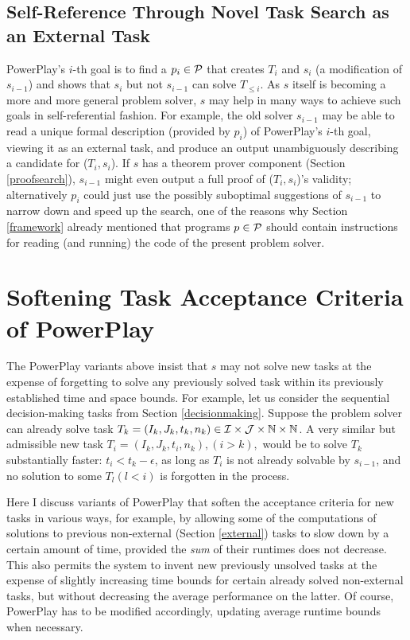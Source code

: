 \documentclass{article}
\begin{document}
\subsection{Self-Reference Through Novel Task Search as an External Task}
\label{self}

 {\sc PowerPlay}'s $i$-th goal is to find a $p_i \in \cal P$ that creates $T_i$ and $s_i$ 
(a modification of $s_{i-1}$)    
and shows that  $s_i$ but not $s_{i-1}$ can solve $T_{\leq i}$. 
As $s$ itself is becoming a more and more general problem solver,  
$s$ may help in many ways to achieve such goals in self-referential fashion.
For example, the old solver $s_{i-1}$ may be able to
read a unique formal description (provided by $p_i$) of {\sc PowerPlay}'s $i$-th goal, viewing it as an external task,
and produce an output unambiguously describing
a candidate for ($T_i,s_i$). 
If $s$ has a theorem prover component (Section \ref{proofsearch}),
$s_{i-1}$ might even output a full proof of ($T_i,s_i$)'s validity; alternatively $p_i$ 
could just use the possibly suboptimal
suggestions of $s_{i-1}$ to  narrow down and speed up the search,
one of the reasons why Section \ref{framework} already mentioned that
programs $p \in \cal P$
should contain instructions for reading  (and running) the code of the present problem solver. 



\section{Softening Task Acceptance Criteria of {\sc PowerPlay}}
\label{softening}

The {\sc PowerPlay} variants above insist that $s$ may not solve new tasks at the expense of forgetting to solve any previously solved task
within its previously established time and space bounds. 
For example, let us consider the sequential decision-making tasks from Section \ref{decisionmaking}.
Suppose the problem solver can already solve task $T_k=(I_k, J_k, t_k, n_k)\in \cal I \times \cal J \times \mathbb{N} \times \mathbb{N}$.
A very similar but admissible new task  $T_i=(I_k, J_k, t_i, n_k), (i>k),$ would be to solve $T_k$ substantially
faster: $t_i<t_k - \epsilon$,
as long as $T_i$ is not already solvable by $s_{i-1}$,
and no solution to some $T_l(l<i)$ is forgotten in the process. 

Here I discuss variants of {\sc PowerPlay} that soften the acceptance criteria for new tasks in various ways,
 for example, by allowing some of the computations of solutions to previous non-external (Section \ref{external}) tasks to slow down by a certain amount of time, provided the {\em sum} of their runtimes  does not decrease.
This also permits the system to invent new previously unsolved tasks at the expense of slightly increasing time bounds 
for certain already solved non-external tasks, but without decreasing the average performance on the latter.
Of course, {\sc PowerPlay} has to be modified accordingly, updating average runtime bounds when necessary.
\end{document}
